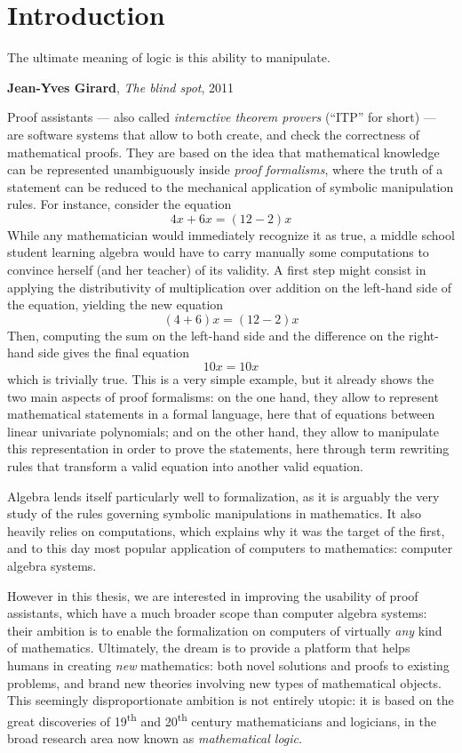 \setchapterpreamble[u]{\margintoc}
\chapter{Introduction}

\epigraph{The ultimate meaning of logic is this ability to manipulate.}
{\textbf{Jean-Yves Girard}, \textit{The blind spot}, 2011}


Proof assistants --- also called \emph{interactive theorem provers} (``ITP'' for
short) --- are software systems that allow to both create, and check the
correctness of mathematical proofs. They are based on the idea that mathematical
knowledge can be represented unambiguously inside \emph{proof formalisms}, where
the truth of a statement can be reduced to the mechanical application of
symbolic manipulation rules. For instance, consider the equation
$$4x + 6x = (12 - 2)x$$ 
While any mathematician would immediately recognize it as true, a middle school
student learning algebra would have to carry manually some computations to
convince herself (and her teacher) of its validity. A first step might consist
in applying the distributivity of multiplication over addition on the left-hand
side of the equation, yielding the new equation
$$(4 + 6)x = (12 - 2)x$$
Then, computing the sum on the left-hand side and the difference on the
right-hand side gives the final equation
$$10x = 10x$$
which is trivially true. This is a very simple example, but it already shows the
two main aspects of proof formalisms: on the one hand, they allow to represent
mathematical statements in a formal language, here that of equations between
linear univariate polynomials; and on the other hand, they allow to manipulate
this representation in order to prove the statements, here through term
rewriting rules that transform a valid equation into another valid equation.

Algebra lends itself particularly well to formalization, as it is arguably the
very study of the rules governing symbolic manipulations in mathematics. It also
heavily relies on computations, which explains why it was the target of the
first, and to this day most popular application of computers to mathematics:
computer algebra systems.

However in this thesis, we are interested in improving the usability of proof
assistants, which have a much broader scope than computer algebra systems: their
ambition is to enable the formalization on computers of virtually \emph{any}
kind of mathematics. Ultimately, the dream is to provide a platform that helps
humans in creating \emph{new} mathematics: both novel solutions and proofs to
existing problems, and brand new theories involving new types of mathematical
objects. This seemingly disproportionate ambition is not entirely utopic: it is
based on the great discoveries of 19\textsuperscript{th} and
20\textsuperscript{th} century mathematicians and logicians, in the broad
research area now known as \emph{mathematical logic}.

